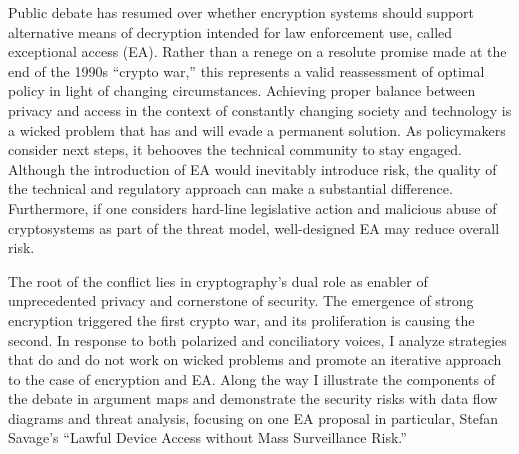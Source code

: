 
Public debate has resumed over whether encryption systems should support alternative means of decryption intended for
law enforcement use, called exceptional access (EA). Rather than a renege on a resolute promise made at the end of the
1990s ``crypto war,'' this represents a valid reassessment of optimal policy in light of changing circumstances.
Achieving proper balance between privacy and access in the context of constantly changing society and technology is a
wicked problem that has and will evade a permanent solution. As policymakers consider next steps, it behooves the
technical community to stay engaged. Although the introduction of EA would inevitably introduce risk, the quality of the
technical and regulatory approach can make a substantial difference. Furthermore, if one considers hard-line legislative
action and malicious abuse of cryptosystems as part of the threat model, well-designed EA may reduce overall risk.

The root of the conflict lies in cryptography's dual role as enabler of unprecedented privacy and cornerstone of
security. The emergence of strong encryption triggered the first crypto war, and its proliferation is causing the
second. In response to both polarized and conciliatory voices, I analyze strategies that do and do not work on wicked
problems and promote an iterative approach to the case of encryption and EA. Along the way I illustrate the components
of the debate in argument maps and demonstrate the security risks with data flow diagrams and threat analysis, focusing
on one EA proposal in particular, Stefan Savage's ``Lawful Device Access without Mass Surveillance Risk.''
